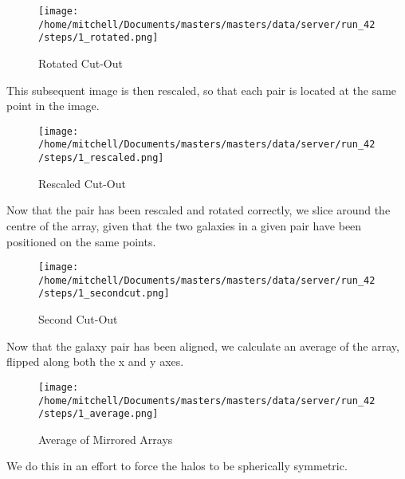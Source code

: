 \begin{figure}[h!]
\centering 
\texttt{[image: /home/mitchell/Documents/masters/masters/data/server/run\_42/steps/1\_rotated.png]}
\caption{Rotated Cut-Out}
\label{fig:rotated}
\end{figure}

This subsequent image is then rescaled, so that each pair is located at the same point in the image.

\begin{figure}[h!]
\centering 
\texttt{[image: /home/mitchell/Documents/masters/masters/data/server/run\_42/steps/1\_rescaled.png]}
\caption{Rescaled Cut-Out}
\label{fig:rescaled}
\end{figure}

Now that the pair has been rescaled and rotated correctly, we slice around the centre of the array, given that the two galaxies in a given pair have been positioned on the same points. 
\begin{figure}[h!]
\centering 
\texttt{[image: /home/mitchell/Documents/masters/masters/data/server/run\_42/steps/1\_secondcut.png]}
\caption{Second Cut-Out}
\label{fig:second_cut}
\end{figure}

Now that the galaxy pair has been aligned, we calculate an average of the array, flipped along both the x and y axes.

\begin{figure}
\centering
\texttt{[image: /home/mitchell/Documents/masters/masters/data/server/run\_42/steps/1\_average.png]}
\caption{Average of Mirrored Arrays}
\label{fig:average_cut}
\end{figure}

We do this in an effort to force the halos to be spherically symmetric. 